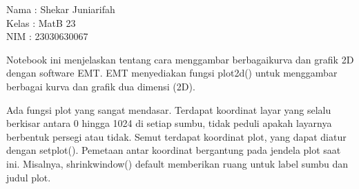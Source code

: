\documentclass{article}
\begin{document}
\begin{eulernotebook}
\begin{eulercomment}
Nama : Shekar Juniarifah\\
Kelas : MatB 23\\
NIM : 23030630067

\begin{eulercomment}
\begin{eulercomment}
Notebook ini menjelaskan tentang cara menggambar berbagaikurva dan
grafik 2D dengan software EMT. EMT menyediakan fungsi plot2d() untuk
menggambar berbagai kurva dan grafik dua dimensi (2D).\\
\end{eulercomment}
\begin{eulercomment}
Ada fungsi plot yang sangat mendasar. Terdapat koordinat layar yang
selalu berkisar antara 0 hingga 1024 di setiap sumbu, tidak peduli
apakah layarnya berbentuk persegi atau tidak. Semut terdapat koordinat
plot, yang dapat diatur dengan setplot(). Pemetaan antar koordinat
bergantung pada jendela plot saat ini. Misalnya, shrinkwindow()
default memberikan ruang untuk label sumbu dan judul plot.


\end{eulercomment}
\end{eulercomment}
\end{eulercomment}
\end{eulernotebook}
\end{document}

